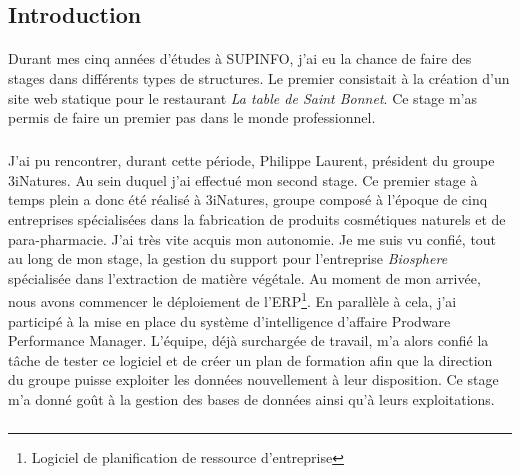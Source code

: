 \documentclass[11pt, a4paper ]{article}
\let\stdsection\section
\renewcommand\section{\newpage\stdsection}
\begin{document}
\begin{spacing}{1.5}
	\section{Introduction} %

\paragraph{}
Durant mes cinq années d'études à SUPINFO, j'ai eu la chance de faire des stages dans différents types de structures. Le premier consistait à la création d'un site web statique pour le restaurant \emph{La table de Saint Bonnet}. Ce stage m'as permis de faire un premier pas dans le monde professionnel.
\subparagraph{}
J'ai pu rencontrer, durant cette période, Philippe Laurent, président du groupe 3iNatures. Au sein duquel j'ai effectué mon second stage. Ce premier stage à temps plein a donc été réalisé à 3iNatures, groupe composé à l'époque de cinq entreprises spécialisées dans la fabrication de produits cosmétiques naturels et de para-pharmacie. J'ai très vite acquis mon autonomie. Je me suis vu confié, tout au long de mon stage, la gestion du support pour l'entreprise \emph{Biosphere} spécialisée dans l'extraction de matière végétale. Au moment de mon arrivée, nous avons commencer le déploiement de l'ERP\footnote{Logiciel de planification de ressource d'entreprise}. En parallèle à cela, j'ai participé à la mise en place du système d'intelligence d'affaire Prodware Performance Manager. L'équipe, déjà surchargée de travail, m'a alors confié la tâche de tester ce logiciel et de créer un plan de formation afin que la direction du groupe puisse exploiter les données nouvellement à leur disposition. Ce stage m'a donné goût à la gestion des bases de données ainsi qu'à leurs exploitations.
\subparagraph{}

\end{spacing}
\end{document}
